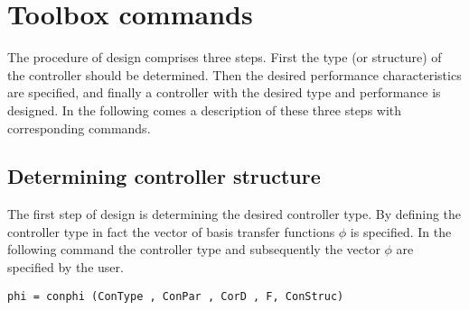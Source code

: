\documentclass [12pt , a4paper] {report}
\begin{document}
\chapter{Toolbox commands}
The procedure of design comprises three steps. First the type (or structure) of the controller should be determined. Then the desired performance characteristics are specified, and finally a controller with the desired type and performance is designed. In the following comes a description of these three steps with corresponding commands.

\section{Determining controller structure}
The first step of design is determining the desired controller type. By defining the controller type in fact the vector of basis transfer functions $\phi$ is specified. In the following command the controller type and subsequently the vector $\phi$ are specified by the user.
\begin{lstlisting}
phi = conphi (ConType , ConPar , CorD , F, ConStruc) 
\end{lstlisting}
\end{document}

